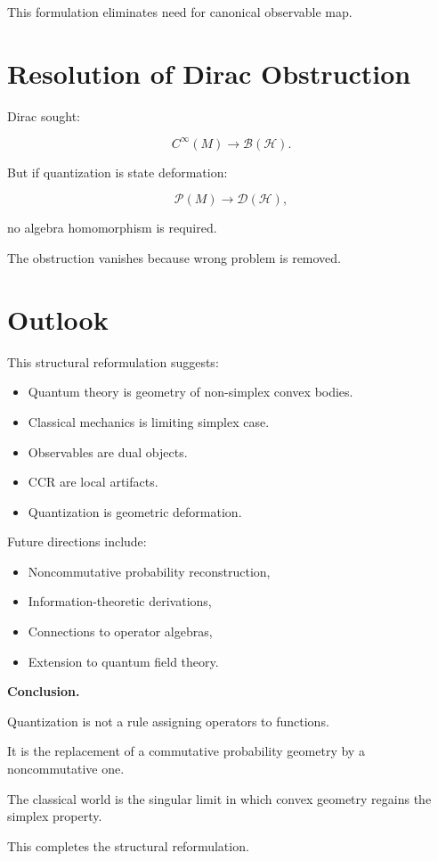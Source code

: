 \documentclass[11pt]{book}
\begin{document}
This formulation eliminates need for canonical observable map.

\section{Resolution of Dirac Obstruction}

Dirac sought:

\[
C^\infty(M) \to \mathcal{B}(\mathcal{H}).
\]

But if quantization is state deformation:

\[
\mathcal{P}(M)
\to
\mathcal{D}(\mathcal{H}),
\]

no algebra homomorphism is required.

The obstruction vanishes because wrong problem is removed.

\section{Outlook}

This structural reformulation suggests:

\begin{itemize}
\item Quantum theory is geometry of non-simplex convex bodies.
\item Classical mechanics is limiting simplex case.
\item Observables are dual objects.
\item CCR are local artifacts.
\item Quantization is geometric deformation.
\end{itemize}

Future directions include:

\begin{itemize}
\item Noncommutative probability reconstruction,
\item Information-theoretic derivations,
\item Connections to operator algebras,
\item Extension to quantum field theory.
\end{itemize}

\bigskip

\noindent
\textbf{Conclusion.}

Quantization is not a rule assigning operators to functions.

It is the replacement of a commutative probability geometry by a noncommutative one.

The classical world is the singular limit in which convex geometry regains the simplex property.

\bigskip

This completes the structural reformulation.
\end{document}
